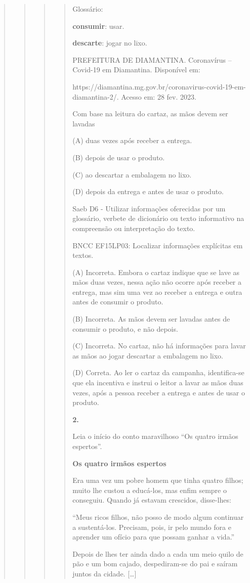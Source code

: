 \begin{quote}
\begin{quote}
\begin{quote}
\begin{quote}
Glossário:

\textbf{consumir}: usar.

\textbf{descarte}: jogar no lixo.

PREFEITURA DE DIAMANTINA. Coronavírus -- Covid-19 em Diamantina.
Disponível em:

https://diamantina.mg.gov.br/coronavirus-covid-19-em-diamantina-2/.
Acesso em: 28 fev. 2023.

Com base na leitura do cartaz, as mãos devem ser lavadas

(A) duas vezes após receber a entrega.

(B) depois de usar o produto.

(C) ao descartar a embalagem no lixo.

(D) depois da entrega e antes de usar o produto.

Saeb D6 - Utilizar informações oferecidas por um glossário, verbete de
dicionário ou texto informativo na compreensão ou interpretação do
texto.

BNCC EF15LP03: Localizar informações explícitas em textos.

(A) Incorreta. Embora o cartaz indique que se lave as mãos duas vezes,
nessa ação não ocorre após receber a entrega, mas sim uma vez ao receber
a entrega e outra antes de consumir o produto.

(B) Incorreta. As mãos devem ser lavadas antes de consumir o produto, e
não depois.

(C) Incorreta. No cartaz, não há informações para lavar as mãos ao jogar
descartar a embalagem no lixo.

(D) Correta. Ao ler o cartaz da campanha, identifica-se que ela
incentiva e instrui o leitor a lavar as mãos duas vezes, após a pessoa
receber a entrega e antes de usar o produto.

\textbf{2.}

Leia o início do conto maravilhoso ``Os quatro irmãos espertos''.

\textbf{Os quatro irmãos espertos}

Era uma vez um pobre homem que tinha quatro filhos; muito lhe custou a
educá-los, mas enfim sempre o conseguiu. Quando já estavam crescidos,
disse-lhes:

``Meus ricos filhos, não posso de modo algum continuar a sustentá-los.
Precisam, pois, ir pelo mundo fora e aprender um ofício para que possam
ganhar a vida.''

Depois de lhes ter ainda dado a cada um meio quilo de pão e um bom
cajado, despediram-se do pai e saíram juntos da cidade. {[}\ldots{}{]}


\end{quote}
\end{quote}
\end{quote}
\end{quote}
